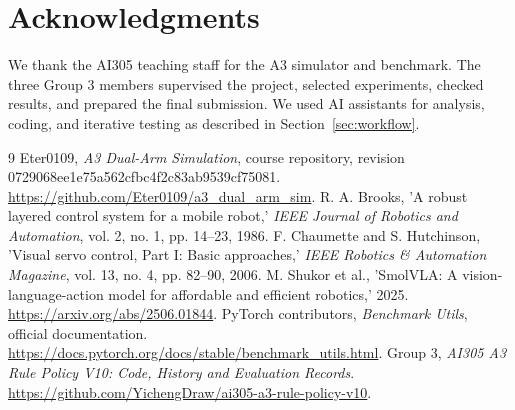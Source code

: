 \documentclass[10pt,twocolumn]{article}
\begin{document}
\section*{Acknowledgments}
We thank the AI305 teaching staff for the A3 simulator and benchmark. The three Group 3 members supervised the project, selected experiments, checked results, and prepared the final submission. We used AI assistants for analysis, coding, and iterative testing as described in Section~\ref{sec:workflow}.
\begin{thebibliography}{9}\footnotesize\setlength{\itemsep}{1pt}
Eter0109, \emph{A3 Dual-Arm Simulation}, course repository, revision 0729068ee1e75a562cfbc4f2c83ab9539cf75081.
\url{https://github.com/Eter0109/a3_dual_arm_sim}.
R. A. Brooks, 'A robust layered control system for a mobile robot,'
\emph{IEEE Journal of Robotics and Automation}, vol. 2, no. 1, pp. 14--23, 1986.
F. Chaumette and S. Hutchinson, 'Visual servo control, Part I: Basic approaches,'
\emph{IEEE Robotics \& Automation Magazine}, vol. 13, no. 4, pp. 82--90, 2006.
M. Shukor et al., 'SmolVLA: A vision-language-action model for affordable and efficient robotics,' 2025.
\url{https://arxiv.org/abs/2506.01844}.
PyTorch contributors, \emph{Benchmark Utils}, official documentation.
\url{https://docs.pytorch.org/docs/stable/benchmark_utils.html}.
Group 3, \emph{AI305 A3 Rule Policy V10: Code, History and Evaluation Records}.
\url{https://github.com/YichengDraw/ai305-a3-rule-policy-v10}.
\end{thebibliography}
\appendix

\end{document}
